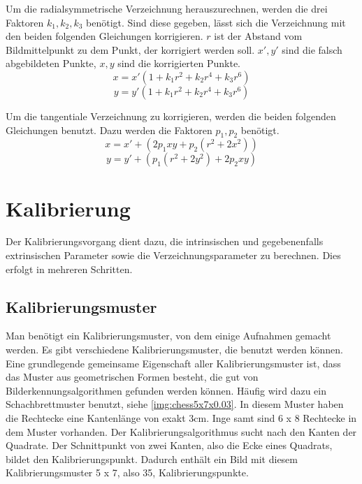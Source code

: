 Um die radialsymmetrische Verzeichnung herauszurechnen, werden die drei Faktoren $k_1, k_2, k_3$ benötigt. Sind diese gegeben, lässt sich die Verzeichnung mit den beiden folgenden Gleichungen korrigieren. $r$ ist der Abstand vom Bildmittelpunkt zu dem Punkt, der korrigiert werden soll. $x', y'$ sind die falsch abgebildeten Punkte, $x,y$ sind die korrigierten Punkte.
\begin{equation}
	x = x'(1 + k_1 r^2 + k_2 r^4 + k_3 r^6)
\end{equation}
\begin{equation}
	y = y'(1 + k_1 r^2 + k_2 r^4 + k_3 r^6)
\end{equation}

Um die tangentiale Verzeichnung zu korrigieren, werden die beiden folgenden Gleichungen benutzt. Dazu werden die Faktoren $p_1, p_2$ benötigt.
\begin{equation}
	x = x' + (2 p_1 xy + p_2 (r^2 + 2 x^2))
\end{equation}
\begin{equation}
	y = y' + (p_1(r^2 + 2 y^2) + 2p_2 xy)
\end{equation}

\section{Kalibrierung} %
\label{sec:kalibrierung}
Der Kalibrierungsvorgang dient dazu, die intrinsischen und gegebenenfalls extrinsischen Parameter sowie die Verzeichnungsparameter zu berechnen. Dies erfolgt in mehreren Schritten.

\subsection{Kalibrierungsmuster} %
\label{sub:kalibrierungsmuster}
Man benötigt ein Kalibrierungsmuster, von dem einige Aufnahmen gemacht werden. Es gibt verschiedene Kalibrierungsmuster, die benutzt werden können. Eine grundlegende gemeinsame Eigenschaft aller Kalibrierungsmuster ist, dass das Muster aus geometrischen Formen besteht, die gut von Bilderkennungsalgorithmen gefunden werden können. Häufig wird dazu ein Schachbrettmuster benutzt, siehe \autoref{img:chess5x7x0.03}. In diesem Muster haben die Rechtecke eine Kantenlänge von exakt 3cm. Inge samt sind 6 x 8 Rechtecke in dem Muster vorhanden. Der Kalibrierungsalgorithmus sucht nach den Kanten der Quadrate. Der Schnittpunkt von zwei Kanten, also die Ecke eines Quadrats, bildet den Kalibrierungspunkt. Dadurch enthält ein Bild mit diesem Kalibrierungsmuster 5 x 7, also 35, Kalibrierungspunkte.


